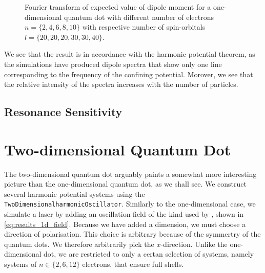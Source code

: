 \begin{figure}
    \centering
    \caption{Fourier transform of expected value of dipole moment for 
        a one-dimensional quantum dot with different number of electrons
        $n=\{2,4,6,8,10\}$ with respective number of spin-orbitals 
        $l=\{20,20,20,30,30,40\}$.
    }
    \label{fig:1d_dipole_spectra}
\end{figure}

We see that the result is in accordance with the harmonic potential theorem, as the 
simulations have produced dipole spectra that show only one line corresponding to the 
frequency of the confining potential. Morover, we see that the relative intensity of 
the spectra increases with the number of particles.

\subsection{Resonance Sensitivity}

\section{Two-dimensional Quantum Dot}

The two-dimensional quantum dot arguably paints a somewhat more interesting picture 
than the one-dimensional quantum dot, as we shall see. We construct several 
harmonic potential systems using the  \lstinline{TwoDimensionalharmonicOscillator}.
Similarly to the one-dimensional case, we simulate a laser by adding an 
oscillation field of the kind used by
\citeauthor{pedersen2019symplectic}\cite{pedersen2019symplectic}, shown 
in \autoref{eq:results_1d_field}. Because we have added a dimension, we must 
choose a direction of polarisation. This choice is arbitrary because of the 
symmertry of the quantum dots. We therefore arbitrarily pick the $x$-direction.
Unlike the one-dimensional dot, we are restricted to only a certan selection of 
systems, namely systems of $n\in\{2,6,12\}$ electrons, that ensure full shells.

